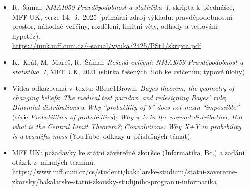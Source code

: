 \documentclass[11pt,a4paper]{article}
\begin{document}
{\raggedright
\begin{itemize}
  \item R.~Šámal: \emph{NMAI059 Pravděpodobnost a statistika~1}, skripta k~přednášce, MFF UK, verze 14.~6.~2025 (primární zdroj výkladu: pravděpodobnostní prostor, náhodné veličiny, rozdělení, limitní věty, odhady a testování hypotéz).\\ \url{https://iuuk.mff.cuni.cz/~samal/vyuka/2425/PSt1/skripta.pdf}
  \item K.~Král, M.~Mareš, R.~Šámal: \emph{Řešená cvičení: NMAI059 Pravděpodobnost a statistika~1}, MFF UK, 2021 (sbírka řešených úloh ke cvičením; typové úlohy).
  \item Videa odkazovaná v~textu: 3Blue1Brown, \emph{Bayes theorem, the geometry of changing beliefs}; \emph{The medical test paradox, and redesigning Bayes' rule}; \emph{Binomial distributions} a \emph{Why ``probability of 0'' does not mean ``impossible''} (série \emph{Probabilities of probabilities}); \emph{Why $\pi$ is in the normal distribution}; \emph{But what is the Central Limit Theorem?}; \emph{Convolutions: Why X+Y in probability is a beautiful mess} (YouTube, odkazy u~příslušných témat).
  \item MFF UK: požadavky ke státní závěrečné zkoušce (Informatika, Bc.) a zadání otázek z~minulých termínů.\\ \url{https://www.mff.cuni.cz/cs/studenti/bakalarske-studium/statni-zaverecne-zkousky/bakalarske-statni-zkousky-studijniho-programu-informatika}
\end{itemize}
\par}
\end{document}
